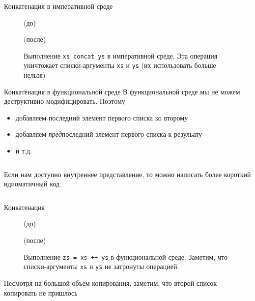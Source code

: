 \begin{frame}[fragile]{Конкатенация в императивной среде}
\begin{figure}[h]
	\par
	(до)\par
	\par
	(после)\par
	\caption{Выполнение \texttt{xs concat ys} в императивной среде. Эта операция уничтожает списки-аргументы \texttt{xs} и \texttt{ys} (их использовать больше нельзя)}
	\label{fig:2.4}
\end{figure}
\end{frame}


\begin{frame}[fragile]{Конкатенация в функциональной среде}
В функциональной среде мы не можем деструктивно модифицировать. Поэтому
\begin{itemize}
\item добавляем последний элемент первого списка ко второму
\item добавляем \emph{пред}последний элемент первого списка к резульату
\item и т.д.
\end{itemize}

\inputminted[firstline=50,lastline=54] {haskell}{code/Stacks.hs}
Если нам доступно внутреннее представление, то можно написать более короткий идиоматичный код
\inputminted[firstline=57,lastline=58,gobble=2] {haskell}{code/Stacks.hs}
\end{frame}


\begin{frame}[fragile]{Конкатенация}
\begin{figure}[h]
	\centering
	\par
	(до)\par
	\vspace{0.5cm}
	\par
	(после)\par
	\vspace{0.5cm}
	\caption{Выполнение \texttt{zs = xs ++ ys} в функциональной среде. Заметим, что списки-аргументы \texttt{xs} и \texttt{ys} не затронуты операцией.
	}
	\label{fig:2.5}
\end{figure}
Несмотря на большой объем копирования, заметим, что второй список копировать не пришлось
\end{frame}

